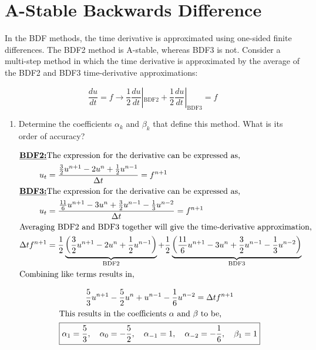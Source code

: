 \section{A-Stable Backwards Difference}
In the BDF methods, the time derivative is approximated using one-sided finite differences.  The BDF2 method is A-stable, whereas BDF3 is not.  Consider a multi-step method in which the time derivative is approximated by the average of the BDF2 and BDF3 time-derivative approximations:

\begin{equation*}
    \frac{du}{dt} = f \rightarrow \frac{1}{2}\frac{du}{dt}|_{\text{BDF2}} + \frac{1}{2}\frac{du}{dt}|_{\text{BDF3}} = f
\end{equation*}

\begin{enumerate}[label=\alph*., start = 1]
    \item Determine the coefficients $\alpha_k$ and $\beta_k$ that define this method.  What is its order of accuracy?
    
    \vspace{-0.35in}
    \begin{align*}
        \shortintertext{\textbf{\underline{BDF2:}}\newline The expression for the derivative can be expressed as,}
        u_t & = \frac{\frac{3}{2}u^{n+1} - 2u^n + \frac{1}{2}u^{n-1}}{\Delta t} = f^{n+1}\\
        \shortintertext{\textbf{\underline{BDF3:}}\newline The expression for the derivative can be expressed as,}
        u_t & = \frac{\frac{11}{6}u^{n+1} - 3u^n + \frac{3}{2}u^{n-1} - \frac{1}{3}u^{n-2}}{\Delta t} = f^{n+1}\\
        \shortintertext{Averaging BDF2 and BDF3 together will give the time-derivative approximation,}
        \Delta tf^{n+1} & = \frac{1}{2}\underbrace{\left(\frac{3}{2}u^{n+1} - 2u^n + \frac{1}{2}u^{n-1}\right)}_{\text{BDF2}} + \frac{1}{2}\underbrace{\left(\frac{11}{6}u^{n+1} - 3u^n + \frac{3}{2}u^{n-1} - \frac{1}{3}u^{n-2}\right)}_{\text{BDF3}}\\
        \shortintertext{Combining like terms results in,}
    \end{align*}

    \vspace{-0.65in}
    \begin{gather*}
        \frac{5}{3}u^{n+1} - \frac{5}{2}u^n + u^{n-1} - \frac{1}{6}u^{n-2} = \Delta t f^{n+1}\\
        \shortintertext{This results in the coefficients $\alpha$ and $\beta$ to be,}
        \boxed{\alpha_1 = \frac{5}{3},\quad \alpha_0 = -\frac{5}{2},\quad \alpha_{-1} = 1,\quad \alpha_{-2}=-\frac{1}{6},\quad \beta_1 = 1}
    \end{gather*}


\end{enumerate}
